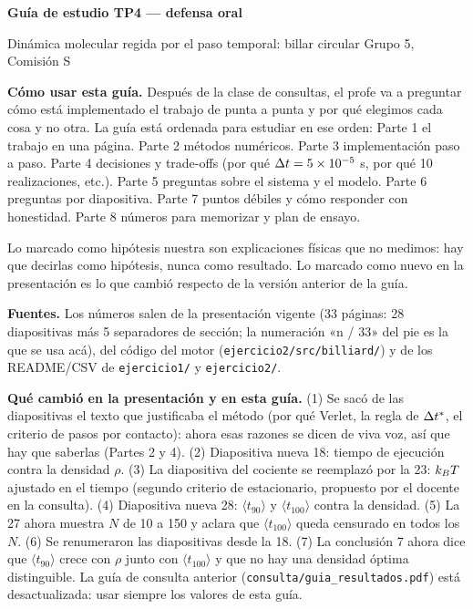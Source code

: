 \documentclass[10.5pt,a4paper]{article}
\begin{document}
{\LARGE\bfseries Guía de estudio TP4 --- defensa oral}\par
{\large Dinámica molecular regida por el paso temporal: billar circular \textbar{} Grupo 5, Comisión S}\par
\vspace{4pt}

\textbf{Cómo usar esta guía.} Después de la clase de consultas, el profe va a preguntar cómo está implementado el trabajo de punta a punta y por qué elegimos cada cosa y no otra. La guía está ordenada para estudiar en ese orden: Parte 1 el trabajo en una página. Parte 2 métodos numéricos. Parte 3 implementación paso a paso. Parte 4 decisiones y trade-offs (por qué $\Delta t=5\times10^{-5}$ s, por qué 10 realizaciones, etc.). Parte 5 preguntas sobre el sistema y el modelo. Parte 6 preguntas por diapositiva. Parte 7 puntos débiles y cómo responder con honestidad. Parte 8 números para memorizar y plan de ensayo.

Lo marcado como \colorbox{hipo}{hipótesis nuestra} son explicaciones físicas que no medimos: hay que decirlas como hipótesis, nunca como resultado. Lo marcado como \colorbox{nuevo}{nuevo en la presentación} es lo que cambió respecto de la versión anterior de la guía.

\textbf{Fuentes.} Los números salen de la presentación vigente (33 páginas: 28 diapositivas más 5 separadores de sección; la numeración «n / 33» del pie es la que se usa acá), del código del motor (\texttt{ejercicio2/src/billiard/}) y de los README/CSV de \texttt{ejercicio1/} y \texttt{ejercicio2/}.

\textbf{Qué cambió en la presentación y en esta guía.} (1) Se sacó de las diapositivas el texto que justificaba el método (por qué Verlet, la regla de $\Delta t^{*}$, el criterio de pasos por contacto): ahora esas razones se dicen de viva voz, así que hay que saberlas (Partes 2 y 4). (2) Diapositiva nueva 18: tiempo de ejecución contra la densidad $\rho$. (3) La diapositiva del cociente \vv{} se reemplazó por la 23: $k_BT$ ajustado en el tiempo (segundo criterio de estacionario, propuesto por el docente en la consulta). (4) Diapositiva nueva 28: $\langle t_{90}\rangle$ y $\langle t_{100}\rangle$ contra la densidad. (5) La 27 ahora muestra $N$ de 10 a 150 y aclara que $\langle t_{100}\rangle$ queda censurado en todos los $N$. (6) Se renumeraron las diapositivas desde la 18. (7) La conclusión 7 ahora dice que $\langle t_{90}\rangle$ crece con $\rho$ junto con $\langle t_{100}\rangle$ y que no hay una densidad óptima distinguible. La guía de consulta anterior (\texttt{consulta/guia\_resultados.pdf}) está desactualizada: usar siempre los valores de esta guía.
\end{document}
